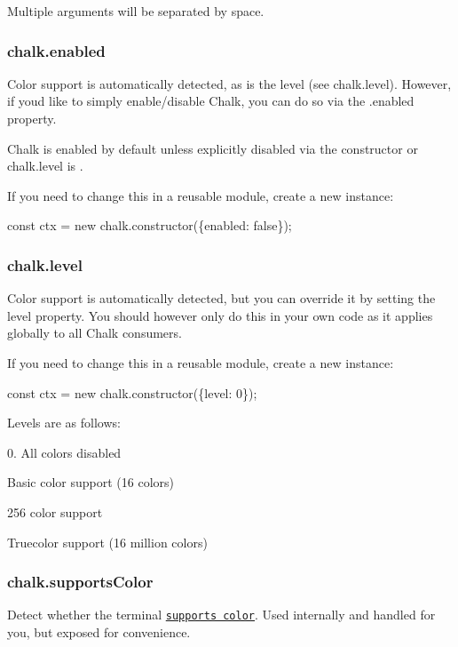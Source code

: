 Multiple arguments will be separated by space.

\subsubsection*{chalk.\+enabled}

Color support is automatically detected, as is the level (see {\ttfamily chalk.\+level}). However, if you\textquotesingle{}d like to simply enable/disable Chalk, you can do so via the {\ttfamily .enabled} property.

Chalk is enabled by default unless explicitly disabled via the constructor or {\ttfamily chalk.\+level} is {}.

If you need to change this in a reusable module, create a new instance\+:


\begin{DoxyCode}
const ctx = new chalk.constructor(\{enabled: false\});
\end{DoxyCode}


\subsubsection*{chalk.\+level}

Color support is automatically detected, but you can override it by setting the {\ttfamily level} property. You should however only do this in your own code as it applies globally to all Chalk consumers.

If you need to change this in a reusable module, create a new instance\+:


\begin{DoxyCode}
const ctx = new chalk.constructor(\{level: 0\});
\end{DoxyCode}


Levels are as follows\+:

0. All colors disabled
\begin{DoxyEnumerate}
\item Basic color support (16 colors)
\item 256 color support
\item Truecolor support (16 million colors)
\end{DoxyEnumerate}

\subsubsection*{chalk.\+supports\+Color}

Detect whether the terminal \href{https://github.com/chalk/supports-color}{\tt supports color}. Used internally and handled for you, but exposed for convenience.

